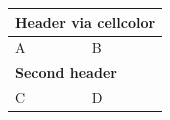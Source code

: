 \documentclass[10pt]{article}
\begin{document}
\begin{tabular}{|p{5cm}|p{5cm}|}
\hline
\multicolumn{2}{|p{10.2cm}|}{\cellcolor{navy}\color{white}\textbf{Header via cellcolor}} \\
\hline
A & B \\
\hline
\multicolumn{2}{|p{10.2cm}|}{\cellcolor{navy}\color{white}\textbf{Second header}} \\
\hline
C & D \\
\hline
\end{tabular}
\end{document}
